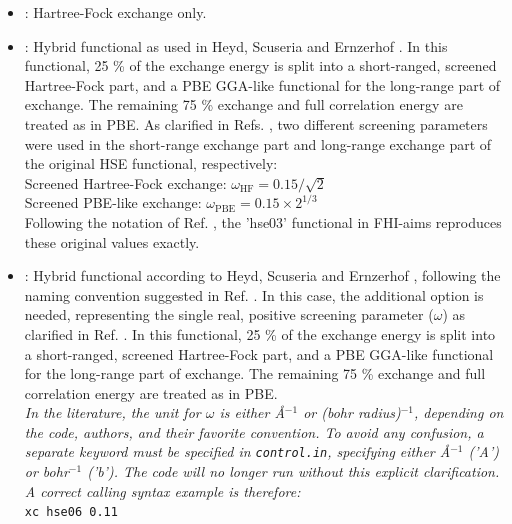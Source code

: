 \begin{itemize}
\begin{itemize}
        for details). Note that this is therefore \emph{not} exactly
        the same B3LYP as originally described by Becke in 1993. 
      \item {} : Hartree-Fock exchange only.
      \item {} : Hybrid functional as used in Heyd, Scuseria and
        Ernzerhof \cite{Heyd03,Heyd06}. In this functional, 25 \% of the exchange energy is
        split into a short-ranged, screened Hartree-Fock part, and a PBE
        GGA-like functional for the long-range part of exchange. The remaining
        75 \% exchange and full correlation energy are treated as in PBE. As
        clarified in Refs. \cite{Krukau06,Heyd06}, two different screening parameters
        were used in the short-range exchange part and long-range exchange
        part of the original HSE functional, respectively: \\
        Screened Hartree-Fock exchange: $\omega_\text{HF}=0.15/\sqrt{2}$ \\
        Screened PBE-like exchange: $\omega_\text{PBE}=0.15\times 2^{1/3}$ \\
        Following the notation of Ref. \cite{Krukau06}, the 'hse03' functional 
        in FHI-aims reproduces these original values exactly.
      \item {} : Hybrid functional according to
        Heyd, Scuseria and Ernzerhof \cite{Heyd03}, following the naming convention
        suggested in Ref. \cite{Krukau06}. In this case, the
        additional option  is needed, representing the single
        real, positive screening parameter  ($\omega$) as clarified
        in Ref. \cite{Krukau06}. In this functional, 25 \% of the
        exchange energy is split into a short-ranged, screened
        Hartree-Fock part, and a PBE GGA-like functional for the
        long-range part of exchange. The remaining
        75 \% exchange and full correlation energy are treated as in PBE. \\
        \emph{In the literature, the unit for $\omega$ is either {\AA}$^{-1}$ or (bohr radius)$^{-1}$, 
        depending on the code, authors, and their favorite convention. To avoid any confusion,
        a separate keyword  must be specified in \texttt{control.in}, specifying
        either {\AA}$^{-1}$ ('A') or bohr$^{-1}$ ('b'). The code will no longer run without this
        explicit clarification. A correct calling syntax example is therefore:} \\
        \texttt{xc hse06 0.11} \\

\end{itemize}
\end{itemize}
